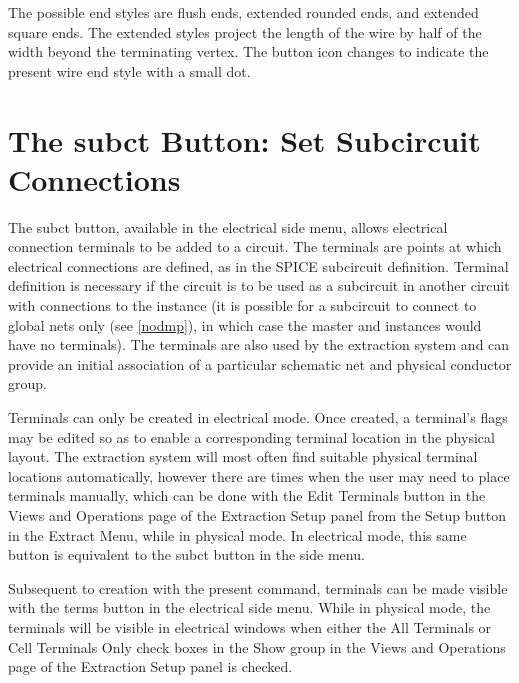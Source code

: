 The possible end styles are flush ends, extended rounded ends, and
extended square ends.  The extended styles project the length of the
wire by half of the width beyond the terminating vertex.  The button
icon changes to indicate the present wire end style with a small dot.


\section{The {\cb subct} Button: Set Subcircuit Connections}
\label{subct}

The {\cb subct} button, available in the electrical side menu, allows
electrical connection terminals to be added to a circuit.  The
terminals are points at which electrical connections are defined, as
in the SPICE subcircuit definition.  Terminal definition is necessary
if the circuit is to be used as a subcircuit in another circuit with
connections to the instance (it is possible for a subcircuit to
connect to global nets only (see \ref{nodmp}), in which case the
master and instances would have no terminals).  The terminals are also
used by the extraction system and can provide an initial association
of a particular schematic net and physical conductor group. 

Terminals can only be created in electrical mode.  Once created, a
terminal's flags may be edited so as to enable a corresponding
terminal location in the physical layout.  The extraction system will
most often find suitable physical terminal locations automatically,
however there are times when the user may need to place terminals
manually, which can be done with the {\cb Edit Terminals} button in
the {\cb Views and Operations} page of the {\cb Extraction Setup}
panel from the {\cb Setup} button in the {\cb Extract Menu}, while in
physical mode.  In electrical mode, this same button is equivalent to
the {\cb subct} button in the side menu.

Subsequent to creation with the present command, terminals can be made
visible with the {\cb terms} button in the electrical side menu. 
While in physical mode, the terminals will be visible in electrical
windows when either the {\cb All Terminals} or {\cb Cell Terminals
Only} check boxes in the {\cb Show} group in the {\cb Views and
Operations} page of the {\cb Extraction Setup} panel is checked. 

